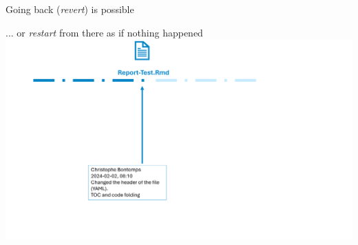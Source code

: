 \documentclass[xcolor=x11names,compress, aspectratio=169]{beamer}
\renewcommand{\(}{\begin{columns}}
\renewcommand{\)}{\end{columns}}
\newcommand{\<}[1]{\begin{column}{#1}}
\renewcommand{\>}{\end{column}}
\begin{document}
\begin{frame}{Going back (\emph{revert}) is possible}
\begin{center}
\begin{itemize}
    {... or \emph{restart} from there as if nothing happened }
    {\includegraphics[width = 1.0\textwidth]{FileLifeRevert2.png} \\ }

\end{itemize}
\end{center}
\end{frame}
\end{document}
